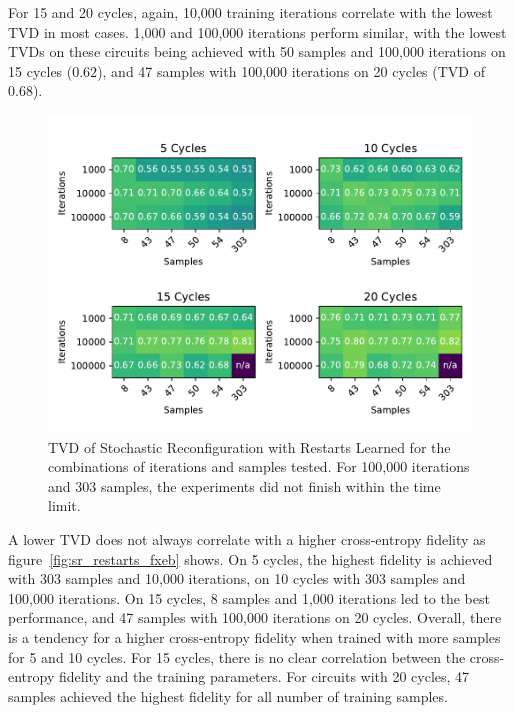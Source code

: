 For 15 and 20 cycles, again, 10,000 training iterations correlate with the lowest TVD in most cases. 1,000
and 100,000 iterations perform similar, with the lowest TVDs on these circuits being achieved with 50 samples and 
100,000 iterations on 15 cycles ($0.62$), and 47 samples with 100,000 iterations on 20 cycles (TVD of $0.68$).

\begin{figure}[H]
  \centering
  \includegraphics[width=\textwidth]{figures/results/SR-restarts-learned/tvd_heatmap.pdf}
  \caption[TVD of Stochastic Reconfiguration with Restarts Learned]{TVD of Stochastic 
  Reconfiguration with Restarts Learned for the combinations of iterations and samples tested.
  For 100,000 iterations and 303 samples, the experiments did not finish within the time limit.}
  \label{fig:sr_restarts_tvd}
\end{figure}

A lower TVD does not always correlate with a higher cross-entropy fidelity as figure~\ref{fig:sr_restarts_fxeb}
shows. On 5 cycles, the highest fidelity is achieved with 303 samples and 10,000 iterations, on 10 cycles 
with 303 samples and 100,000 iterations. On 15 cycles, 8 samples and 1,000 iterations led to the best performance, 
and 47 samples with 100,000 iterations on 20 cycles. Overall, there is a tendency for a higher cross-entropy fidelity 
when trained with more samples for 5 and 10 cycles. For 15 cycles, there is no clear correlation between the 
cross-entropy fidelity and the training parameters. For circuits with 20 cycles, 47 samples achieved the highest 
fidelity for all number of training samples.


